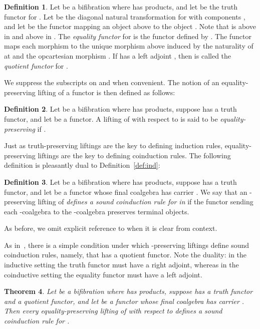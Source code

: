 \documentclass{LMCS}
\theoremstyle{plain}
\newtheorem{theorem}{Theorem}[section]
\theoremstyle{remark}
\theoremstyle{definition}
\newtheorem{definition}[theorem]{Definition}
\begin{document}
\begin{definition}\label{def:eq-fun}
  Let  be a bifibration where  has products, and let
   be the truth functor for . Let  be the diagonal natural transformation for  with
  components , and let  be the functor mapping an object  above  to
  the object . Note that  is
  above  in  and above  in . The {\em
    equality functor} for  is the functor 
  defined by . The functor  maps each
  morphism  to the unique morphism above  induced by
  the naturality of  at  and the opcartesian morphism
  . If  has a left adjoint , then 
  is called the {\em quotient functor} for .
\end{definition}
\noindent
We suppress the subscripts on  and  when convenient. The
notion of an equality-preserving lifting of a functor is then defined
as follows:

\begin{definition}
  Let  be a bifibration where  has products, suppose
   has a truth functor, and let  be a functor. A
  lifting  of  with respect to  is said to be
  {\em equality-preserving} if .
\end{definition}

Just as truth-preserving liftings are the key to defining induction
rules, equality-preserving liftings are the key to defining
coinduction rules. The following definition is pleasantly dual to
Definition~\ref{def:ind}:

\begin{definition}\label{def:coind}
  Let  be a bifibration where  has products, suppose
   has a truth functor, and let  be a functor whose
  final coalgebra has carrier . We say that an -preserving
  lifting  of  \emph{defines a sound coinduction rule for
     in } if the functor  sending each -coalgebra  to the
  -coalgebra  preserves terminal objects.
\end{definition}

\noindent
As before, we omit explicit reference to  when it is clear from context.

As in~\cite{hj98}, there is a simple condition under which
-preserving liftings define sound coinduction rules, namely, that
 has a quotient functor. Note the duality: in the inductive setting
the truth functor  must have a right adjoint, whereas in the
coinductive setting the equality functor  must have a left
adjoint.

\begin{theorem}\label{thm:coind}
  Let  be a bifibration where  has products, suppose
   has a truth functor and a quotient functor, and let  be a functor whose final coalgebra has carrier . Then
  every equality-preserving lifting  of  with respect to
   defines a sound coinduction rule for .
\end{theorem}
\end{document}
